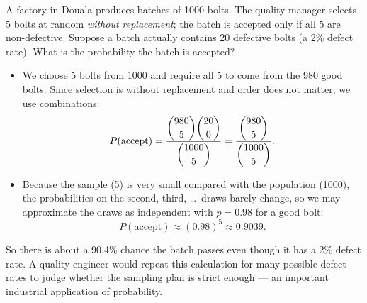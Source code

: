 \documentclass[11pt]{article}
\begin{document}
\begin{experience}
A factory in Douala produces batches of 1000 bolts. The quality manager selects 5 bolts at random \emph{without replacement}; the batch is accepted only if all 5 are non-defective. Suppose a batch actually contains 20 defective bolts (a 2\% defect rate). What is the probability the batch is accepted?
\begin{itemize}
    \item We choose 5 bolts from 1000 and require all 5 to come from the 980 good bolts. Since selection is without replacement and order does not matter, we use combinations:
    \[
    P(\text{accept}) = \frac{\dbinom{980}{5}\dbinom{20}{0}}{\dbinom{1000}{5}} = \frac{\dbinom{980}{5}}{\dbinom{1000}{5}}.
    \]
    \item Because the sample (5) is very small compared with the population (1000), the probabilities on the second, third, \dots\ draws barely change, so we may approximate the draws as independent with $p = 0.98$ for a good bolt:
    \[
    P(\text{accept}) \approx (0.98)^5 \approx 0.9039.
    \]
\end{itemize}
So there is about a 90.4\% chance the batch passes even though it has a 2\% defect rate. A quality engineer would repeat this calculation for many possible defect rates to judge whether the sampling plan is strict enough — an important industrial application of probability.
\end{experience}
\end{document}
